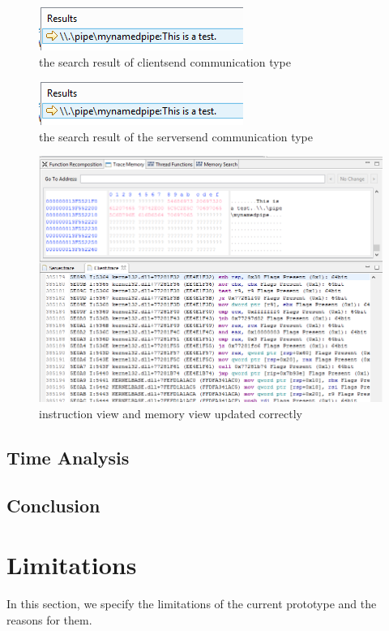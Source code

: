 \documentclass[paper=a4, fontsize=11pt]{scrartcl}
\numberwithin{equation}{section}		%
\numberwithin{figure}{section}			%
\numberwithin{table}{section}				%
\begin{document}
\begin{figure}[H]
\includegraphics{occclientresult}
 \caption{the search result of clientsend communication type}
\label{occclientresult}
\end{figure}


\begin{figure}[H]
\includegraphics{occclientresult}
 \caption{the search result of the serversend communication type}
\label{occclientresult}
\end{figure}

\begin{figure}[H]
\includegraphics[scale=.66]{send}
 \caption{instruction view and memory view updated correctly}
\label{send}
\end{figure}

\subsection{Time Analysis}
\subsection{Conclusion}
\section{Limitations}
In this section, we specify the limitations of the current prototype and the reasons for them. 
\end{document}
